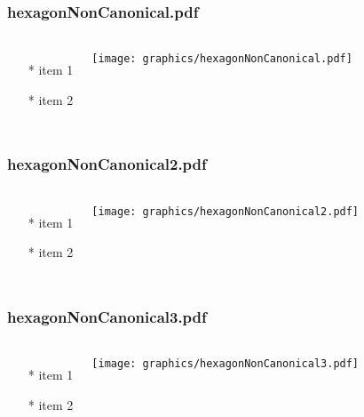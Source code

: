 \begin{frame} \frametitle{hexagonNonCanonical.pdf}
    \begin{columns}[c]
        \begin{itemize}
            \item[*] item 1
            \item[*] item 2
        \end{itemize}
        \begin{minipage}{\linewidth}
            \begin{center}
            \texttt{[image: graphics/hexagonNonCanonical.pdf]}
            \label{gfx:hexagonNonCanonical.pdf}
            \end{center}
        \end{minipage}
    \end{columns}
\end{frame}
\begin{frame} \frametitle{hexagonNonCanonical2.pdf}
    \begin{columns}[c]
        \begin{itemize}
            \item[*] item 1
            \item[*] item 2
        \end{itemize}
        \begin{minipage}{\linewidth}
            \begin{center}
            \texttt{[image: graphics/hexagonNonCanonical2.pdf]}
            \label{gfx:hexagonNonCanonical2.pdf}
            \end{center}
        \end{minipage}
    \end{columns}
\end{frame}
\begin{frame} \frametitle{hexagonNonCanonical3.pdf}
    \begin{columns}[c]
        \begin{itemize}
            \item[*] item 1
            \item[*] item 2
        \end{itemize}
        \begin{minipage}{\linewidth}
            \begin{center}
            \texttt{[image: graphics/hexagonNonCanonical3.pdf]}
            \label{gfx:hexagonNonCanonical3.pdf}
            \end{center}
        \end{minipage}
    \end{columns}
\end{frame}
